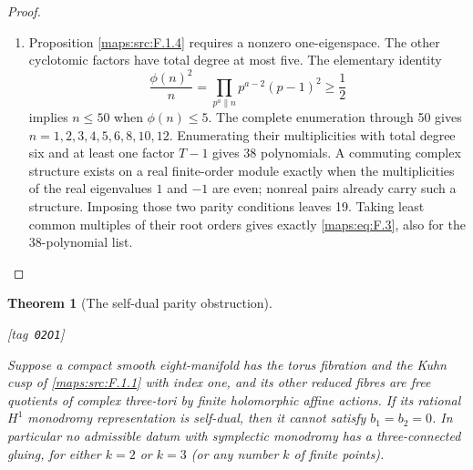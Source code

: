 \documentclass[11pt,a4paper]{article}
\numberwithin{equation}{section}
\newtheorem{theorem}{Theorem}[section]
\theoremstyle{definition}
\newcommand{\StatementRecord}[4]{{\upshape\footnotesize[tag~\texttt{#3}]}\enspace\ignorespaces}
\begin{document}
\begin{proof}
\begin{enumerate}[label=\arabic*.]
\item Proposition \ref{maps:src:F.1.4} requires a nonzero one-eigenspace.  The other
cyclotomic factors have total degree at most five.  The elementary
identity
\[
 \frac{\phi(n)^2}{n}=
 \prod_{p^a\parallel n}p^{a-2}(p-1)^2\geq\frac12
\]
implies $n\leq50$ when $\phi(n)\leq5$.
The complete enumeration through 50 gives
$n=1,2,3,4,5,6,8,10,12$.  Enumerating their multiplicities
with total degree six and at least one factor $T-1$ gives 38
polynomials.  A commuting complex structure exists on a real
finite-order module exactly when the multiplicities of the
real eigenvalues $1$ and $-1$ are even; nonreal pairs already
carry such a structure.  Imposing those two parity conditions
leaves 19.  Taking least common multiples of their root orders
gives exactly \eqref{maps:eq:F.3}, also for the 38-polynomial list.


\end{enumerate}
\end{proof}




\begin{theorem}[The self-dual parity obstruction]\hypertarget{tag-02O1}{}\label{maps:src:F.3.1}
\StatementRecord{maps:src:F.3.1}{proved}{02O1}{\cref{maps:src:F.1.1}}


Suppose a compact smooth eight-manifold has the torus fibration
and the Kuhn cusp of \ref{maps:src:F.1.1} with index one, and its
other reduced fibres are free quotients of complex three-tori
by finite holomorphic affine actions.  If its rational
$H^1$ monodromy representation is self-dual, then it cannot
satisfy $b_1=b_2=0$.  In particular no admissible datum with symplectic monodromy has a three-connected gluing, for either $k=2$ or $k=3$ (or any number $k$ of finite
points).

\end{theorem}
\end{document}
